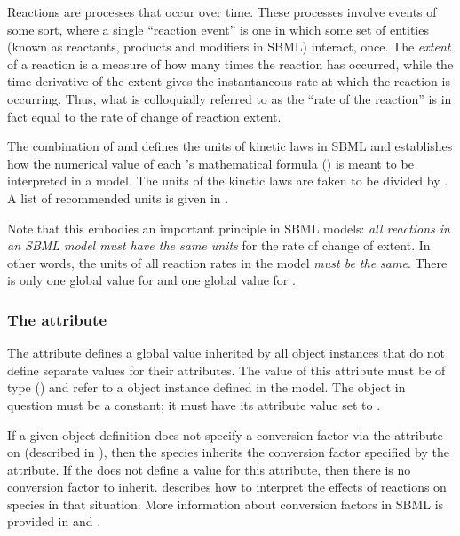 Reactions are processes that occur over time.  These processes
involve events of some sort, where a single ``reaction event'' is
one in which some set of entities (known as reactants, products
and modifiers in SBML) interact, once.  The \emph{extent} of a
reaction is a measure of how many times the reaction has occurred,
while the time derivative of the extent gives the instantaneous
rate at which the reaction is occurring.  Thus, what is
colloquially referred to as the ``rate of the reaction'' is in
fact equal to the rate of change of reaction extent.

The combination of  and 
defines the units of kinetic laws in SBML and establishes how the
numerical value of each \KineticLaw's mathematical formula
() is meant to be interpreted in a
model.  The units of the kinetic laws are taken to be
 divided by .  A list of
recommended units is given in
.

Note that this embodies an important principle in SBML models:
\emph{all reactions in an SBML model must have the same units} for
the rate of change of extent.  In other words, the units of all
reaction rates in the model \emph{must be the same}.  There is
only one global value for  and one global value
for .


\subsubsection{The  attribute}
\label{sec:model-conversionFactor}

The attribute  defines a global value
inherited by all \Species object instances that do not define
separate values for their  attributes.  The
value of this attribute must be of type 
() and refer to a \Parameter object
instance defined in the model.  The \Parameter object in question
must be a constant; \ie it must have its 
attribute value set to .

If a given \Species object definition does not specify a
conversion factor via the  attribute on
\Species (described in ), then the
species inherits the conversion factor specified by the \Model
{} attribute.  If the \Model does not define
a value for this attribute, then there is no conversion factor to
inherit.   describes how to
interpret the effects of reactions on species in that situation.
More information about conversion factors in SBML is provided in
 and .


